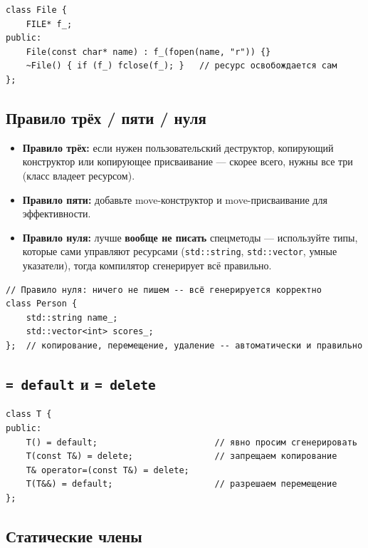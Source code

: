 \begin{lstlisting}
class File {
    FILE* f_;
public:
    File(const char* name) : f_(fopen(name, "r")) {}
    ~File() { if (f_) fclose(f_); }   // ресурс освобождается сам
};
\end{lstlisting}

\subsection{Правило трёх / пяти / нуля}

\begin{itemize}[leftmargin=2em]
    \item \textbf{Правило трёх:} если нужен пользовательский деструктор,
          копирующий конструктор или копирующее присваивание --- скорее всего,
          нужны все три (класс владеет ресурсом).
    \item \textbf{Правило пяти:} добавьте move-конструктор и move-присваивание
          для эффективности.
    \item \textbf{Правило нуля:} лучше \textbf{вообще не писать} спецметоды ---
          используйте типы, которые сами управляют ресурсами
          (\texttt{std::string}, \texttt{std::vector}, умные указатели), тогда
          компилятор сгенерирует всё правильно.
\end{itemize}

\begin{lstlisting}
// Правило нуля: ничего не пишем -- всё генерируется корректно
class Person {
    std::string name_;
    std::vector<int> scores_;
};  // копирование, перемещение, удаление -- автоматически и правильно
\end{lstlisting}

\subsection{\texttt{= default} и \texttt{= delete}}

\begin{lstlisting}
class T {
public:
    T() = default;                       // явно просим сгенерировать
    T(const T&) = delete;                // запрещаем копирование
    T& operator=(const T&) = delete;
    T(T&&) = default;                    // разрешаем перемещение
};
\end{lstlisting}

\subsection{Статические члены}

